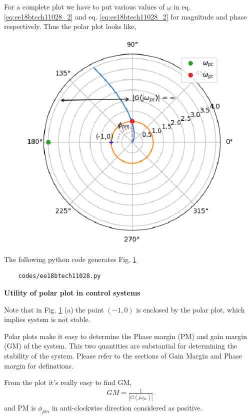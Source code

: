 \begin{enumerate}[label=\thesection.\arabic*.,ref=\thesection.\theenumi]
For a complete plot we have to put various values of $\omega$ in 
eq. \ref{eq:ee18btech11028_2} and eq. \ref{eq:ee18btech11028_2} for magnitude and phase respectively.
Thus the polar plot looks like, 
\begin{figure}[!h]
    \includegraphics[width=\columnwidth]{./figs/ee18btech11028/ee18btech11028.eps}
  \caption{}
  \label{fig:ee18btech11028_fig1}
\end{figure}

The following python code generates  Fig. \ref{fig:ee18btech11028_fig1}
\begin{lstlisting}
    codes/ee18btech11028.py
\end{lstlisting}
\textbf{Utility of polar plot in control systems}

Note that in Fig. \ref{fig:ee18btech11028_fig1} (a) the point $(-1,0)$ is enclosed by the polar plot,
which implies system is not stable.


Polar plots make it easy to determine the Phase margin (PM) and gain margin (GM) of the system.
This two quantities are substantial for determining the stability of the system.
Please refer to the sections of Gain Margin and Phase margin for definations.




From the plot it's really easy to find GM,
\begin{align}
    GM = \frac{1}{|G(j\omega_{pc})|}
    \label{eq:ee18btech11028_6}
\end{align}
and PM is $\phi_{pm}$ in anti-clockwise direction considered as positive.


\end{enumerate}

